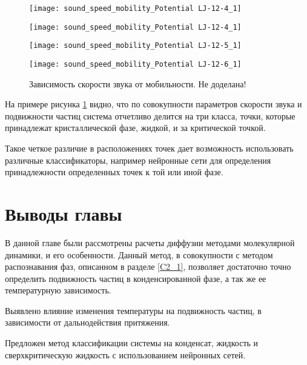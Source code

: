 \begin{figure}[h]
\begin{center}
\begin{minipage}[h]{0.45\linewidth}
\texttt{[image: sound\_speed\_mobility\_Potential LJ-12-4\_1]}
\end{minipage}
\begin{minipage}[h]{0.45\linewidth}
\texttt{[image: sound\_speed\_mobility\_Potential LJ-12-4\_1]}
\end{minipage}

\begin{minipage}[h]{0.45\linewidth}
\texttt{[image: sound\_speed\_mobility\_Potential LJ-12-5\_1]}
\end{minipage}
\begin{minipage}[h]{0.45\linewidth}
\texttt{[image: sound\_speed\_mobility\_Potential LJ-12-6\_1]}
\end{minipage}
\caption{Зависимость скорости звука от мобильности. Не доделана!}
\label{risCMu}
\end{center}
\end{figure}

На примере рисунка \ref{risCMu} видно, что по совокупности параметров скорости звука и подвижности частиц система отчетливо делится на три класса, точки, которые принадлежат кристаллической фазе, жидкой, и за критической точкой. 

Такое четкое различие в расположениях точек дает возможность использовать различные классификаторы, например нейронные сети для определения принадлежности определенных точек к той или иной фазе. 


\section{Выводы главы}\label{C3_3}

В данной главе были рассмотрены расчеты диффузии методами молекулярной динамики, и его особенности. Данный метод, в совокупности с методом распознавания фаз, описанном в разделе \ref{C2_1}, позволяет достаточно точно определить подвижность частиц в конденсированной фазе, а так же ее температурную зависимость.

Выявлено влияние изменения температуры на подвижность частиц, в зависимости от дальнодействия притяжения.

Предложен метод классификации системы на конденсат, жидкость и сверхкритическую жидкость с использованием нейронных сетей.
